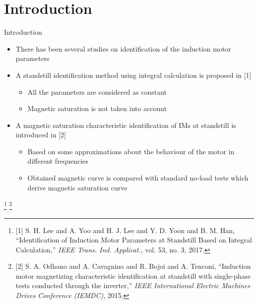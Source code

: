 \documentclass[11pt,aspectratio=169]{beamer}
\begin{document}
\section{Introduction}
\begin{frame}{Introduction}
\begin{itemize}
    \item There has been several studies on identification of the induction motor parameters
    \item A standstill identification method using integral calculation is proposed in [1]
    \begin{itemize}
    \item All the parameters are considered as constant
    \item Magnetic saturation is not taken into account
    \end{itemize}
    \item  A magnetic saturation characteristic identification of IMs at standstill is introduced in [2]
    \begin{itemize}
     \item Based on some approximations about the behaviour of the motor in different frequencies
    \item Obtained magnetic curve is compared with standard no-load tests which derive magnetic saturation curve
    \end{itemize}
\end{itemize}
\footnote{[1] S. H. Lee and A. Yoo and H. J. Lee and Y. D. Yoon and B. M. Han, ``Identification of Induction Motor Parameters at Standstill Based on Integral Calculation,'' \emph{IEEE Trans. Ind. Applicat.}, vol. 53, no. 3, 2017.}
\footnote{[2] S. A. Odhano and A. Cavagnino and R. Bojoi and A. Tenconi, ``Induction motor magnetizing characteristic identification at standstill with single-phase tests conducted through the inverter,'' \emph{ IEEE International Electric Machines Drives Conference (IEMDC)}, 2015.}
\end{frame}
\end{document}
